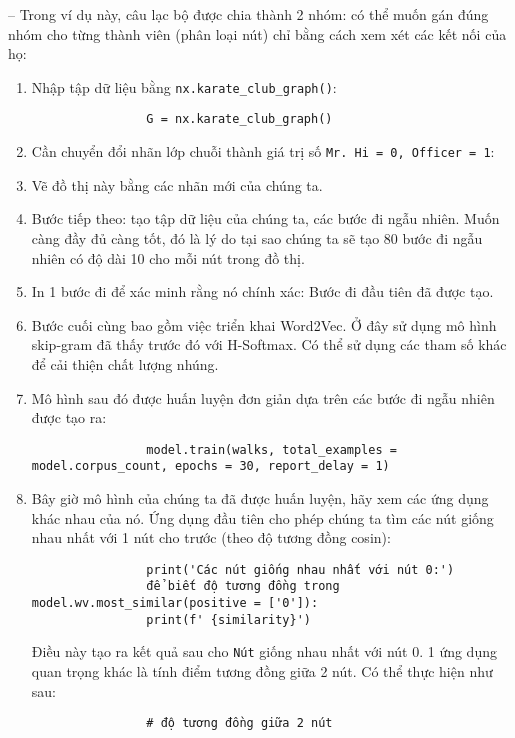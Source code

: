 \documentclass{article}
\begin{document}
\begin{itemize}
\begin{itemize}
        -- Trong ví dụ này, câu lạc bộ được chia thành 2 nhóm: có thể muốn gán đúng nhóm cho từng thành viên (phân loại nút) chỉ bằng cách xem xét các kết nối của họ:
        \begin{enumerate}
            \item Nhập tập dữ liệu bằng \verb|nx.karate_club_graph()|:
            \begin{verbatim}
                G = nx.karate_club_graph()
            \end{verbatim}
            \item Cần chuyển đổi nhãn lớp chuỗi thành giá trị số {\tt Mr. Hi = 0, Officer = 1}:
            \item Vẽ đồ thị này bằng các nhãn mới của chúng ta.
            \item Bước tiếp theo: tạo tập dữ liệu của chúng ta, các bước đi ngẫu nhiên. Muốn càng đầy đủ càng tốt, đó là lý do tại sao chúng ta sẽ tạo 80 bước đi ngẫu nhiên có độ dài 10 cho mỗi nút trong đồ thị.
            \item In 1 bước đi để xác minh rằng nó chính xác: Bước đi đầu tiên đã được tạo.
            \item Bước cuối cùng bao gồm việc triển khai Word2Vec. Ở đây sử dụng mô hình skip-gram đã thấy trước đó với H-Softmax. Có thể sử dụng các tham số khác để cải thiện chất lượng nhúng.
            \item Mô hình sau đó được huấn luyện đơn giản dựa trên các bước đi ngẫu nhiên được tạo ra:
            \begin{verbatim}
                model.train(walks, total_examples = model.corpus_count, epochs = 30, report_delay = 1)
            \end{verbatim}
            \item Bây giờ mô hình của chúng ta đã được huấn luyện, hãy xem các ứng dụng khác nhau của nó. Ứng dụng đầu tiên cho phép chúng ta tìm các nút giống nhau nhất với 1 nút cho trước (theo độ tương đồng cosin):
            \begin{verbatim}
                print('Các nút giống nhau nhất với nút 0:')
                để biết độ tương đồng trong model.wv.most_similar(positive = ['0']):
                print(f' {similarity}')
            \end{verbatim}
            Điều này tạo ra kết quả sau cho {\tt Nút} giống nhau nhất với nút 0. 1 ứng dụng quan trọng khác là tính điểm tương đồng giữa 2 nút. Có thể thực hiện như sau:
            \begin{verbatim}
                # độ tương đồng giữa 2 nút

\end{verbatim}
\end{enumerate}
\end{itemize}
\end{itemize}
\end{document}
